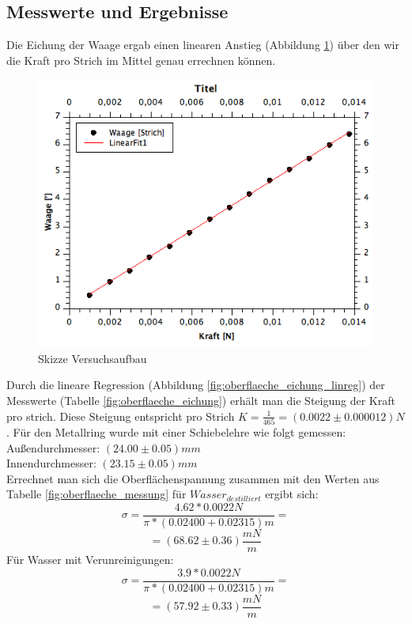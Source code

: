 \documentclass[12pt,a4paper]{article}
\begin{document}
\begin{multicols}{2}
\subsection{Messwerte und Ergebnisse}
Die Eichung der Waage ergab einen linearen Anstieg (Abbildung \ref{fig:oberflaeche_eichung_fit}) über den wir die Kraft pro Strich im Mittel genau errechnen können.
\begin{figure}[H]
	\centering
	\includegraphics[scale=0.45]{./figure/Waageneichung-Fit.png}
	\caption{Skizze Versuchsaufbau}
	\label{fig:oberflaeche_eichung_fit}
\end{figure}
\noindent
Durch die lineare Regression (Abbildung \ref{fig:oberflaeche_eichung_linreg}) der Messwerte (Tabelle \ref{fig:oberflaeche_eichung}) erhält man die Steigung der Kraft pro strich. Diese Steigung entspricht pro Strich \textbf{$K = \frac{1}{465} = (0.0022\pm 0.000012)N$}. Für den Metallring wurde mit einer Schiebelehre wie folgt gemessen:\\
Außendurchmesser: $(24.00 \pm 0.05)mm$\\
Innendurchmesser: $(23.15 \pm 0.05)mm$\\
Errechnet man sich die Oberflächenspannung zusammen mit den Werten aus Tabelle \ref{fig:oberflaeche_messung} für $Wasser_{destilliert}$ ergibt sich:
$$\sigma = \frac{4.62 * 0.0022N}{\pi * (0.02400 + 0.02315)m} =$$ 
$$= (68.62 \pm 0.36) \frac{mN}{m}$$ %
Für Wasser mit Verunreinigungen: 
$$ \sigma = \frac{3.9 * 0.0022N}{\pi * (0.02400 + 0.02315)m} =$$
$$ = (57.92 \pm 0.33) \frac{mN}{m}$$




\end{multicols}
\end{document}
